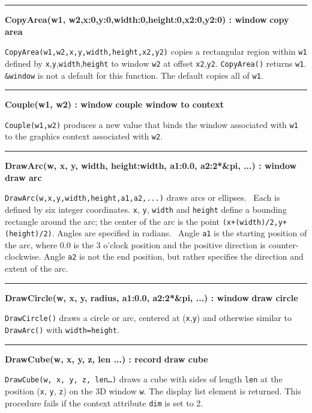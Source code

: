 \bigskip\hrule\vspace{0.1cm}
\noindent
{\bf CopyArea(w1, w2,x:0,y:0,width:0,height:0,x2:0,y2:0) : window } \hfill {\bf copy area}

\noindent
\texttt{CopyArea(w1,w2,x,y,width,height,x2,y2)} copies a rectangular
region within \texttt{w1} defined by
\texttt{x},\texttt{y},\texttt{width},\texttt{height} to window
\texttt{w2} at offset \texttt{x2},\texttt{y2}. \texttt{CopyArea()}
returns \texttt{w1}. \texttt{\&window} is not a default for this
function. The default copies all of \texttt{w1}.

\bigskip\hrule\vspace{0.1cm}
\noindent
{\bf Couple(w1, w2) : window } \hfill {\bf couple window to context}

\noindent
\texttt{Couple(w1,w2)} produces a new value that binds the window
associated with \texttt{w1} to the graphics context associated with
\texttt{w2}.

\bigskip\hrule\vspace{0.1cm}
\noindent
{\bf DrawArc(w, x, y, width, height:width, a1:0.0, a2:2*\&pi, ...) : window } \hfill {\bf draw arc}

\noindent
\texttt{DrawArc(w,x,y,width,height,a1,a2,...)} draws arcs or ellipses.
\ Each is defined by six integer coordinates. \texttt{x}, \texttt{y},
\texttt{width} and \texttt{height} define a bounding rectangle around
the arc; the center of the arc is the point
\texttt{(x+(width)/2,y+(height)/2)}. Angles are specified in radians.
\ Angle \texttt{a1} is the starting position of the arc, where 0.0 is
the 3 o'clock position and the positive direction is
counter-clockwise. Angle \texttt{a2} is not the end position, but
rather specifies the direction and extent of the arc.

\bigskip\hrule\vspace{0.1cm}
\noindent
{\bf DrawCircle(w, x, y, radius, a1:0.0, a2:2*\&pi, ...) : window } \hfill {\bf draw circle}

\noindent
\texttt{DrawCircle()} draws a circle or arc, centered at
(\texttt{x},\texttt{y}) and otherwise similar to \texttt{DrawArc()}
with \texttt{width=height}.

\bigskip\hrule\vspace{0.1cm}
\noindent
{\bf DrawCube(w, x, y, z, len ...) : record } \hfill {\bf draw cube}

\noindent
\texttt{DrawCube(w, x, y, z, len{\dots})} draws a cube with sides of
length \texttt{len} at the position (\texttt{x}, \texttt{y},
\texttt{z}) on the 3D window \texttt{w}. The display list element is
returned. This procedure fails if the context attribute \texttt{dim} is
set to 2. 

